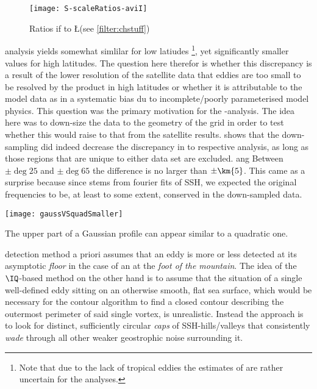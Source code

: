 \begin{wrapfigure}{r}{.6\textwidth}
\texttt{[image: S-scaleRatios-aviI]}
\caption{ Ratios if \scale to \L  (see \cref{filter:chstuff})}
\label{fig:S-scaleRatios-aviI}
\end{wrapfigure}

 \popSevenII analysis yields somewhat simlilar \scale for low latiudes \footnote{Note that due to the lack of tropical eddies the estimates of \scale are rather uncertain for the \POP analyses.}, yet significantly smaller values for high latitudes. The question here therefor is whether this discrepancy is a result of the lower resolution of the satellite data \ie that eddies are too small to be resolved by the \AVI product in high latitudes or whether it is attributable to the model data as in a systematic bias du to incomplete/poorly parameterised model physics. This question was the primary motivation for the \pToaII-analysis. The idea here was to down-size the \POP data to the geometry of the \AVI grid in order to test whether this would raise \scale to that from the satellite results.  shows that the down-sampling did indeed decrease the discrepancy in \scale to respective \AVI analysis, as long as those regions that are unique to either data set are excluded.
ang
Between $\pm \deg{25}$ and $\pm \deg{65}$ the difference is no larger than $\pm \km{5}$. This came as a surprise because since \scale stems from fourier fits of SSH, we expected the original frequencies to be, at least to some extent, conserved in the down-sampled data.

\begin{marginfigure}
\texttt{[image: gaussVSquadSmaller]}
\caption{The upper part of a Gaussian profile can appear similar to a quadratic one.}
\label{fig:gaussVSquad}
\end{marginfigure}


 \MI detection method a priori assumes that an eddy is more or less detected at its asymptotic \textit{floor} \ie in the case of an \AC at the \textit{foot of the mountain}.
 The idea of the $\IQ$-based method on the other hand is to assume that the situation of a single well-defined eddy sitting on an otherwise smooth, flat sea surface, which would be necessary for the contour algorithm to find a closed contour describing the outermost perimeter of said single vortex, is unrealistic. Instead the approach is to look for distinct, sufficiently circular \textit{caps} of SSH-hills/valleys that consistently \textit{wade} through all other weaker geostrophic noise surrounding it. 


